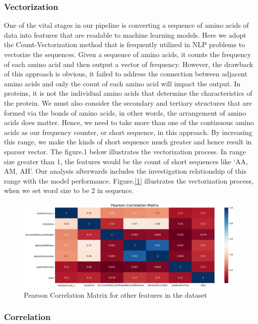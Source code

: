 \documentclass[sigconf]{acmart}
\begin{document}
\subsubsection{Vectorization}
One of the vital stages in our pipeline is converting a sequence of amino acids of data into features that are readable to machine learning models. Here we adopt the Count-Vectorization method that is frequently utilized in NLP problems to vectorize the sequences. Given a sequence of amino acids, it counts the frequency of each amino acid and then output a vector of frequency. However, the drawback of this approach is obvious, it failed to address the connection between adjacent amino acids and only the count of each amino acid will impact the output. In proteins, it is not the individual amino acids that determine the characteristics of the protein. We must also consider the secondary and tertiary structures that are formed via the bonds of amino acids, in other words, the arrangement of amino acids does matter. Hence, we need to take more than one of the continuous amino acids as our frequency counter, or short sequence, in this approach. By increasing this range, we make the kinds of short sequence much greater and hence result in sparser vector. The figure.1 below illustrates the vectorization process. In range size greater than 1, the features would be the count of short sequences like ‘AA, AM, AH’. Our analysis afterwards includes the investigation relationship of this range with the model performance. Figure.\ref{1} illustrates the vectorization process, when we set word size to be 2 in sequence.

\begin{figure}[h]
  \centering
  \includegraphics[width=\linewidth]{2.jpeg}
  \caption{Pearson Correlation Matrix for other features in the dataset}
  \label{2}
\end{figure}
\subsubsection{Correlation}
\end{document}
